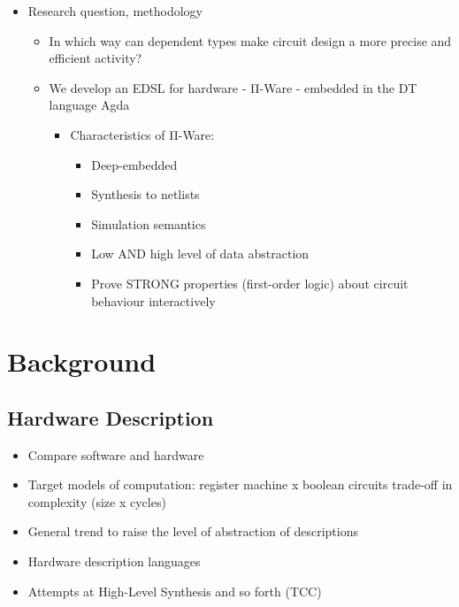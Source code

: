 \documentclass[a4paper,draft]{report}
\begin{document}

        \begin{itemize}
            \item Research question, methodology
            \begin{itemize}
                \item In which way can dependent types make circuit design a more precise and efficient activity?
                \item We develop an EDSL for hardware - Π-Ware - embedded in the DT language Agda
                \begin{itemize}
                    \item Characteristics of Π-Ware:
                    \begin{itemize}
                        \item Deep-embedded
                        \item Synthesis to netlists
                        \item Simulation semantics
                        \item Low AND high level of data abstraction
                        \item Prove STRONG properties (first-order logic) about circuit behaviour interactively
                    \end{itemize}
                \end{itemize}
            \end{itemize}
        \end{itemize}


    \chapter{Background}
    \label{chap:hardware}

        \section{Hardware Description}
        \label{sec:hardware-description}
            \begin{itemize}
                \item Compare software and hardware
                \item Target models of computation: register machine x boolean circuits
                    \subitem trade-off in complexity (size x cycles)

                \item General trend to raise the level of abstraction of descriptions
                \item Hardware description languages

                \item Attempts at High-Level Synthesis and so forth (TCC)
            \end{itemize}
\end{document}
